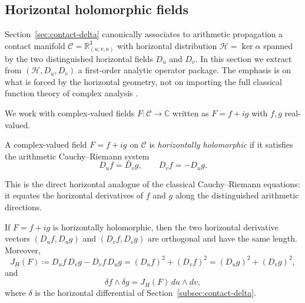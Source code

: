 
\subsection{Horizontal holomorphic fields}\label{subsec:analytic-horizontal-holomorphic}

Section~\ref{sec:contact-delta} canonically associates to arithmetic propagation a contact manifold $\mathcal{C}=\mathbb{R}^3_{(u,v,a)}$ with horizontal distribution $\mathcal{H}=\ker\alpha$ spanned by the two distinguished horizontal fields $D_u$ and $D_v$. In this section we extract from $(\mathcal{H},D_u,D_v)$ a first-order analytic operator package. The emphasis is on what is forced by the horizontal geometry, not on importing the full classical function theory of complex analysis \cite{Ahlfors1979ComplexAnalysis}.

We work with complex-valued fields $F:\mathcal{C}\to\mathbb{C}$ written as $F=f+ig$ with $f,g$ real-valued.

\begin{definition}\label{def:horizontal-holomorphic}
A complex-valued field $F=f+ig$ on $\mathcal{C}$ is \emph{horizontally holomorphic} if it satisfies the arithmetic Cauchy--Riemann system
\begin{equation}\label{eq:analytic-cr}
D_u f=D_v g,
\qquad
D_v f=-D_u g.
\end{equation}
\end{definition}

This is the direct horizontal analogue of the classical Cauchy--Riemann equations: it equates the horizontal derivatives of $f$ and $g$ along the distinguished arithmetic directions.

\begin{lemma}\label{lemma:analytic-horizontal-conformal}
If $F=f+ig$ is horizontally holomorphic, then the two horizontal derivative vectors $(D_u f,D_u g)$ and $(D_v f,D_v g)$ are orthogonal and have the same length. Moreover,
\begin{equation}\label{eq:analytic-jacobian}
J_H(F)\coloneqq D_u f\,D_v g-D_v f\,D_u g
=(D_u f)^2+(D_v f)^2=(D_u g)^2+(D_v g)^2,
\end{equation}
and
\[
\delta f\wedge \delta g=J_H(F)\,du\wedge dv,
\]
where $\delta$ is the horizontal differential of Section~\ref{subsec:contact-delta}.
\end{lemma}

